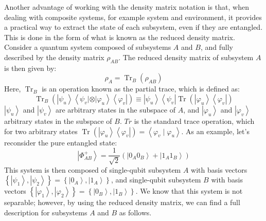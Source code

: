 Another advantage of working with the density matrix notation is that, when dealing with composite systems, for example system and environment, it provides a practical way to extract the state of each subsystem, even if they are entangled. This is done in the form of what is known as the reduced density matrix.
Consider a quantum system composed of subsystems $A$ and $B$, and fully described by the density matrix $\rho_{A B}$. The reduced density matrix of subsystem $A$ is then given by:
$$
\rho_{A}=\operatorname{Tr}_{B}\left(\rho_{A B}\right)
$$
Here, $\operatorname{Tr}_{B}$ is an operation known as the partial trace, which is defined as:
$$
\operatorname{Tr}_{B}\left(\left|\psi_{u}\right\rangle\left\langle\psi_{v}|\otimes| \varphi_{u}\right\rangle\left\langle\varphi_{v}\right|\right) \equiv\left|\psi_{u}\right\rangle\left\langle\psi_{v}\right| \operatorname{Tr}\left(\left|\varphi_{u}\right\rangle\left\langle\varphi_{v}\right|\right)
$$
$\left|\psi_{u}\right\rangle$ and $\left|\psi_{v}\right\rangle$ are arbitrary states in the subspace of $A$, and $\left|\varphi_{u}\right\rangle$ and $\left|\varphi_{v}\right\rangle$ arbitrary states in the subspace of $B$. $Tr$ is the standard trace operation, which for two arbitrary states $\operatorname{Tr}\left(\left|\varphi_{u}\right\rangle\left\langle\varphi_{v}\right|\right)=\left\langle\varphi_{v} \mid \varphi_{u}\right\rangle .$ 
As an example, let's reconsider the pure entangled state:
$$
\left|\Phi^{+}_{A B}\right\rangle=\frac{1}{\sqrt{2}}\left(\left|0_{A} 0_{B}\right\rangle+\left|1_{A} 1_{B}\right\rangle\right)
$$
This system is then composed of single-qubit subsystem $A$ with basis vectors $\left\{\left|\psi_{1}\right\rangle,\left|\psi_{2}\right\rangle\right\}=\left\{\left|0_{A}\right\rangle,\left|1_{A}\right\rangle\right\}$, and single-qubit subsystem $B$ with basis vectors $\left\{\left|\varphi_{1}\right\rangle,\left|\varphi_{2}\right\rangle\right\}=\left\{\left|0_{B}\right\rangle,\left|1_{B}\right\rangle\right\} .$ We know that this system is not separable; however, by using the reduced density matrix, we can find a full description for subsystems $A$ and $B$ as follows.

